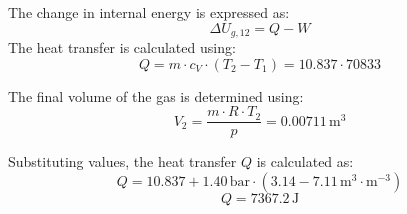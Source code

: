 The change in internal energy is expressed as:  
\[
\Delta U_{g,12} = Q - W
\]  
The heat transfer is calculated using:  
\[
Q = m \cdot c_V \cdot (T_2 - T_1) = 10.837 \cdot 70833
\]  

The final volume of the gas is determined using:  
\[
V_2 = \frac{m \cdot R \cdot T_2}{p} = 0.00711 \, \text{m}^3
\]  

Substituting values, the heat transfer \( Q \) is calculated as:  
\[
Q = 10.837 + 1.40 \, \text{bar} \cdot (3.14 - 7.11 \, \text{m}^3 \cdot \text{m}^{-3})
\]  
\[
Q = 7367.2 \, \text{J}
\]